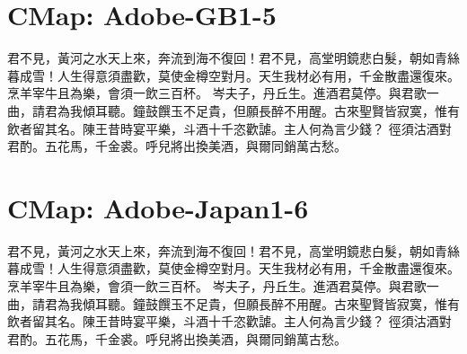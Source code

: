\documentclass{article}
\begin{document}
\section{CMap: Adobe-GB1-5}
\selectfont
君不見，黃河之水天上來，奔流到海不復回！君不見，高堂明鏡悲白髮，朝如青絲暮成雪！人生得意須盡歡，莫使金樽空對月。天生我材必有用，千金散盡還復來。烹羊宰牛且為樂，會須一飲三百杯。
岑夫子，丹丘生。進酒君莫停。與君歌一曲，請君為我傾耳聽。鐘鼓饌玉不足貴，但願長醉不用醒。古來聖賢皆寂寞，惟有飲者留其名。陳王昔時宴平樂，斗酒十千恣歡謔。主人何為言少錢？
徑須沽酒對君酌。五花馬，千金裘。呼兒將出換美酒，與爾同銷萬古愁。


\section{CMap: Adobe-Japan1-6}
\selectfont
君不見，黃河之水天上來，奔流到海不復回！君不見，高堂明鏡悲白髮，朝如青絲暮成雪！人生得意須盡歡，莫使金樽空對月。天生我材必有用，千金散盡還復來。烹羊宰牛且為樂，會須一飲三百杯。
岑夫子，丹丘生。進酒君莫停。與君歌一曲，請君為我傾耳聽。鐘鼓饌玉不足貴，但願長醉不用醒。古來聖賢皆寂寞，惟有飲者留其名。陳王昔時宴平樂，斗酒十千恣歡謔。主人何為言少錢？
徑須沽酒對君酌。五花馬，千金裘。呼兒將出換美酒，與爾同銷萬古愁。
\end{document}

